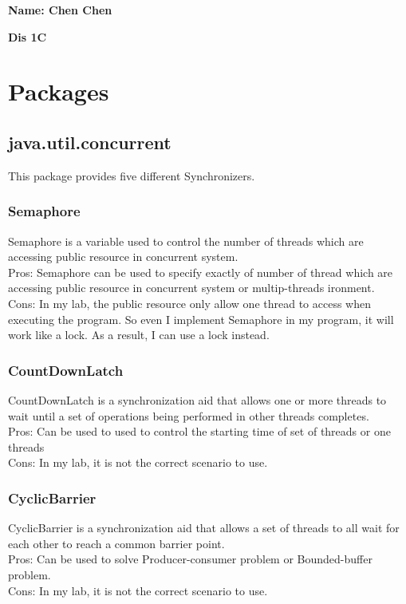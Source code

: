 \documentclass[10pt, a4paper]{IEEEtran}
\begin{document}
    \centerline{\textbf{Name: Chen Chen}}
    \centerline{\textbf{Dis 1C}}

    \section{Packages}
    \subsection{java.util.concurrent}
    This package provides five different Synchronizers.\\
    \subsubsection{Semaphore}
    Semaphore is a variable used to control the number of threads which are accessing public resource in concurrent system.\\
    Pros: Semaphore can be used to specify exactly of number of thread which are accessing public resource in concurrent system or multip-threads ironment. \\
    Cons: In my lab, the public resource only allow one thread to access when executing the program. So even I implement Semaphore in my program, it will work like a lock. As a result, I can use a lock instead.\\
    \subsubsection{CountDownLatch}
    CountDownLatch is a synchronization aid that allows one or more threads to wait until a set of operations being performed in other threads completes.\\
    Pros: Can be used to used to control the starting time of set of threads or one threads\\
    Cons: In my lab, it is not the correct scenario to use.\\
    \subsubsection{CyclicBarrier}
    CyclicBarrier is a synchronization aid that allows a set of threads to all wait for each other to reach a common barrier point.\\
    Pros: Can be used to solve Producer-consumer problem or Bounded-buffer problem.\\
    Cons: In my lab, it is not the correct scenario to use.\\
\end{document}
